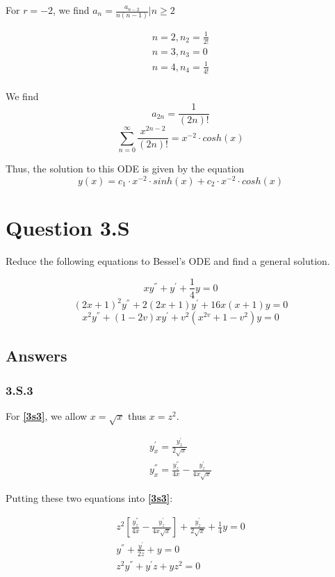 \documentclass{article}
\begin{document}
For $r = -2$, we find $a_n = \frac{a_{n-2}}{n(n-1)} \Bigr| n \geq 2$

\begin{align*}
n=2, n_2 = \frac{1}{2!}\\
n=3, n_3 = 0\\
n=4, n_4 = \frac{1}{4!}\\
\end{align*}

We find
$$a_{2n} = \frac{1}{(2n)!}$$
$$\sum_{n=0}^{\infty} \frac{x^{2n-2}}{(2n)!} = x^{-2} \cdot cosh(x)$$

Thus, the solution to this ODE is given by the equation $$y(x) = c_1 \cdot x^{-2} \cdot sinh(x) + c_2 \cdot x^{-2} \cdot cosh(x)$$
\par
\section*{Question 3.S}
Reduce the following equations to Bessel's ODE and find a general solution.

\begin{equation}\label{3s3} xy^{''}+y^{'}+\frac{1}{4}y = 0 \end{equation}
\begin{equation}\label{3s8} (2x+1)^2y^{''} + 2(2x+1)y^{'} + 16x(x+1)y = 0 \end{equation}  
\begin{equation}\label{3s10} x^2y^{''}+(1-2v)xy^{'}+v^2(x^{2v}+1-v^2)y = 0 \end{equation}

\subsection*{Answers}

\subsubsection*{3.S.3}

For \textbf{\eqref{3s3}}, we allow $x=\sqrt{x}$ thus $x=z^2$.

\begin{align*}
y_x^{'} = \frac{y_z^{'}}{2\sqrt{x}}\\
y_x^{''} = \frac{y_z^{''}}{4x} - \frac{y_z^{'}}{4x\sqrt{x}}
\end{align*}

Putting these two equations into \textbf{\eqref{3s3}}:

\begin{align*}
z^2\left[\frac{y_z^{''}}{4x} - \frac{y_z^{'}}{4x\sqrt{x}}\right] +  \frac{y_z^{'}}{2\sqrt{x}} + \frac{1}{4} y = 0\\
y^{''} + \frac{y^{'}}{2z} + y=0\\
z^2y^{''} + y^{'}z + yz^2=0
\end{align*}
\end{document}
